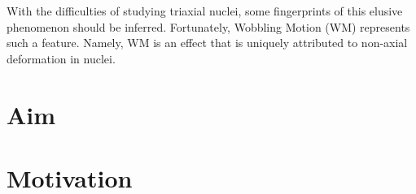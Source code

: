 With the difficulties of studying triaxial nuclei, some fingerprints of this elusive phenomenon should be inferred. Fortunately, Wobbling Motion (WM) represents such a feature. Namely, WM is an effect that is uniquely attributed to non-axial deformation in nuclei. 

\section{Aim}



\section{Motivation}



